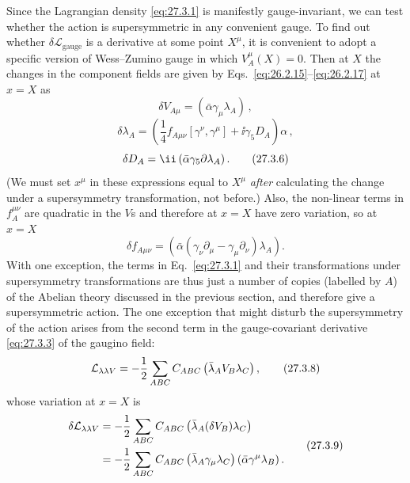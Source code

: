 Since the Lagrangian density \eqref{eq:27.3.1} is manifestly
gauge-invariant, we can test whether the action is supersymmetric in any
convenient gauge. To find out whether
\(\delta\mathcal{L}_{\mathrm{gauge}}\) is a derivative at some point
\(X^\mu\), it is convenient to adopt a specific version of Wess--Zumino
gauge in which \(V_A^\mu(X)=0\). Then at \(X\) the changes in the component
fields are given by Eqs.~\eqref{eq:26.2.15}--\eqref{eq:26.2.17} at \(x=X\)
as
\begin{equation}
  \delta V_{A\mu}=(\bar\alpha\gamma_\mu\lambda_A)\,,
  \tag{27.3.4}\label{eq:27.3.4}
\end{equation}
\begin{equation}
  \delta\lambda_A
  =\left(
    \frac14 f_{A\mu\nu}[\gamma^\nu,\gamma^\mu]
    +\ii\gamma_5D_A
  \right)\alpha\,,
  \tag{27.3.5}\label{eq:27.3.5}
\end{equation}
\begin{equation}
  \delta D_A=\ii\left(\bar\alpha\gamma_5\sl{\partial}\lambda_A\right).
  \tag{27.3.6}\label{eq:27.3.6}
\end{equation}
(We must set \(x^\mu\) in these expressions equal to \(X^\mu\)
\textit{after} calculating the change under a supersymmetry transformation,
not before.) Also, the non-linear terms in \(f_A^{\mu\nu}\) are quadratic
in the \(V\)s and therefore at \(x=X\) have zero variation, so at \(x=X\)
\begin{equation}
  \delta f_{A\mu\nu}
  =\left(\bar\alpha
    (\gamma_\nu\partial_\mu-\gamma_\mu\partial_\nu)\lambda_A
  \right).
  \tag{27.3.7}\label{eq:27.3.7}
\end{equation}
With one exception, the terms in Eq.~\eqref{eq:27.3.1} and their
transformations under supersymmetry transformations are thus just a number
of copies (labelled by \(A\)) of the Abelian theory discussed in the
previous section, and therefore give a supersymmetric action. The one
exception that might disturb the supersymmetry of the action arises from
the second term in the gauge-covariant derivative \eqref{eq:27.3.3} of the
gaugino field:
\begin{equation}
  \mathcal{L}_{\lambda\lambda V}
  =-\frac12\sum_{ABC}C_{ABC}
    \left(\bar\lambda_A\sl{V}_B\lambda_C\right),
  \tag{27.3.8}\label{eq:27.3.8}
\end{equation}
whose variation at \(x=X\) is
\begin{equation}
  \begin{aligned}
  \delta\mathcal{L}_{\lambda\lambda V}
  &=-\frac12\sum_{ABC}C_{ABC}
    \left(\bar\lambda_A(\delta\sl{V}_B)\lambda_C\right)
  \\
  &=-\frac12\sum_{ABC}C_{ABC}
    \left(\bar\lambda_A\gamma_\mu\lambda_C\right)
    \left(\bar\alpha\gamma^\mu\lambda_B\right).
  \end{aligned}
  \tag{27.3.9}\label{eq:27.3.9}
\end{equation}

